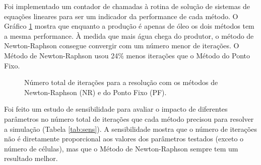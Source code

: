 \documentclass[final,5p]{elsarticle}
\numberwithin{equation}{section}
\begin{document}
        Foi implementado um contador de chamadas à rotina de solução de sistemas de equações lineares para ser um indicador da performance de cada método. O Gráfico \ref{fig:chamadasgauss} mostra que enquanto a produção é apenas de óleo os dois métodos tem a mesma performance. À medida que mais água chega do produtor, o método de Newton-Raphson consegue convergir com um número menor de iterações. O Método de Newton-Raphson usou 24\% menos iterações que o Método do Ponto Fixo.

        \begin{figure}[hbt!]
            \caption{Número total de iterações para a resolução com os métodos de Newton-Raphson (NR) e do Ponto Fixo (PF).}
            \label{fig:chamadasgauss}
        \end{figure}

        Foi feito um estudo de sensibilidade para avaliar o impacto de diferentes parâmetros no número total de iterações que cada método precisou para resolver a simulação (Tabela \ref{tab:sens}). A sensibilidade mostra que o número de iterações não é diretamente proporcional aos valores dos parâmetros testados (exceto o número de células), mas que o Método de Newton-Raphson sempre tem um resultado melhor.
\end{document}
